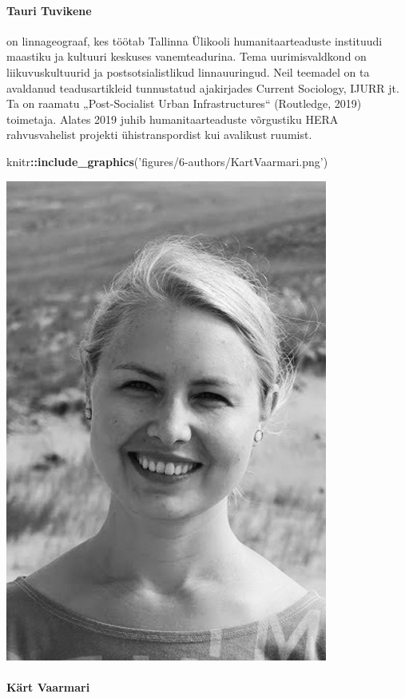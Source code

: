 \documentclass[estonian,]{article}
\newenvironment{Shaded}{\begin{snugshade}}{\end{snugshade}}
\newcommand{\KeywordTok}[1]{\textcolor[rgb]{0.13,0.29,0.53}{\textbf{#1}}}
\newcommand{\NormalTok}[1]{#1}
\newcommand{\OperatorTok}[1]{\textcolor[rgb]{0.81,0.36,0.00}{\textbf{#1}}}
\newcommand{\StringTok}[1]{\textcolor[rgb]{0.31,0.60,0.02}{#1}}
\let\oldparagraph\paragraph
\renewcommand{\paragraph}[1]{\oldparagraph{#1}\mbox{}}
\begin{document}
\hypertarget{tauri-tuvikene}{%
\paragraph{Tauri Tuvikene}\label{tauri-tuvikene}}

on linnageograaf, kes töötab Tallinna Ülikooli humanitaarteaduste instituudi maastiku ja kultuuri keskuses vanemteadurina. Tema uurimisvaldkond on liikuvuskultuurid ja postsotsialistlikud linnauuringud. Neil teemadel on ta avaldanud teadusartikleid tunnustatud ajakirjades Current Sociology, IJURR jt. Ta on raamatu „Post-Socialist Urban Infrastructures`` (Routledge, 2019) toimetaja. Alates 2019 juhib humanitaarteaduste võrgustiku HERA rahvusvahelist projekti ühistranspordist kui avalikust ruumist.

\begin{Shaded}
\begin{Highlighting}[]
\NormalTok{knitr}\OperatorTok{::}\KeywordTok{include_graphics}\NormalTok{(}\StringTok{'figures/6-authors/KartVaarmari.png'}\NormalTok{)}
\end{Highlighting}
\end{Shaded}

\begin{flushleft}\includegraphics[width=0.5\linewidth]{figures/6-authors/KartVaarmari} \end{flushleft}

\hypertarget{kuxe4rt-vaarmari}{%
\paragraph{Kärt Vaarmari}\label{kuxe4rt-vaarmari}}
\end{document}
